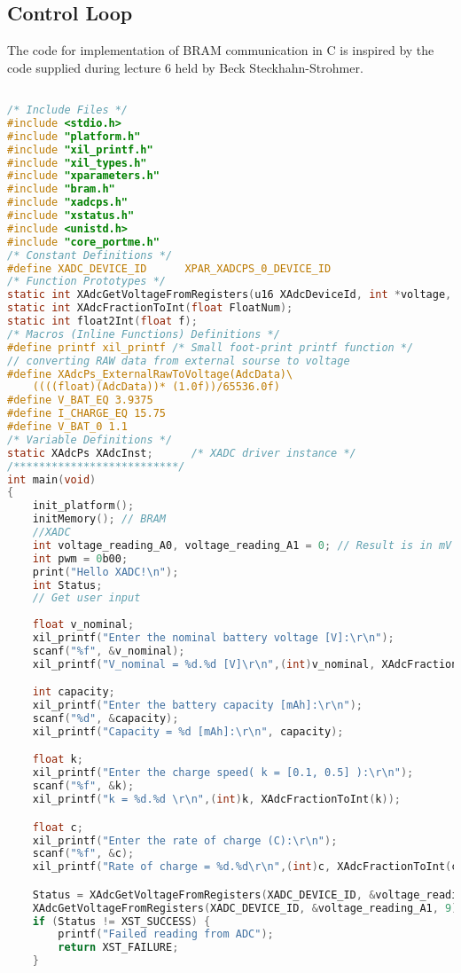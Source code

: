 \documentclass[../report.tex]{subfiles}
\begin{document}
\subsection{Control Loop}
The code for implementation of BRAM communication in C is inspired by the code supplied during lecture 6 held by Beck Steckhahn-Strohmer.
\begin{lstlisting}[language=C, showstringspaces=false]

/* Include Files */
#include <stdio.h>
#include "platform.h"
#include "xil_printf.h"
#include "xil_types.h"
#include "xparameters.h"
#include "bram.h"
#include "xadcps.h"
#include "xstatus.h"
#include <unistd.h>
#include "core_portme.h"
/* Constant Definitions */
#define XADC_DEVICE_ID 		XPAR_XADCPS_0_DEVICE_ID
/* Function Prototypes */
static int XAdcGetVoltageFromRegisters(u16 XAdcDeviceId, int *voltage, int register_offset);
static int XAdcFractionToInt(float FloatNum);
static int float2Int(float f);
/* Macros (Inline Functions) Definitions */
#define printf xil_printf /* Small foot-print printf function */
// converting RAW data from external sourse to voltage
#define XAdcPs_ExternalRawToVoltage(AdcData)\
	((((float)(AdcData))* (1.0f))/65536.0f)
#define V_BAT_EQ 3.9375
#define I_CHARGE_EQ 15.75
#define V_BAT_0 1.1
/* Variable Definitions */
static XAdcPs XAdcInst;      /* XADC driver instance */
/**************************/
int main(void)
{
	init_platform();
	initMemory(); // BRAM
	//XADC
	int voltage_reading_A0, voltage_reading_A1 = 0; // Result is in mV going from 0V = 0 to 1000 = 3.3V
	int pwm = 0b00;
	print("Hello XADC!\n");
	int Status;
	// Get user input
	
	float v_nominal;
	xil_printf("Enter the nominal battery voltage [V]:\r\n");
	scanf("%f", &v_nominal);
	xil_printf("V_nominal = %d.%d [V]\r\n",(int)v_nominal, XAdcFractionToInt(v_nominal));

	int capacity;
	xil_printf("Enter the battery capacity [mAh]:\r\n");
	scanf("%d", &capacity);
	xil_printf("Capacity = %d [mAh]:\r\n", capacity);

	float k;
	xil_printf("Enter the charge speed( k = [0.1, 0.5] ):\r\n");
	scanf("%f", &k);
	xil_printf("k = %d.%d \r\n",(int)k, XAdcFractionToInt(k));

	float c;
	xil_printf("Enter the rate of charge (C):\r\n");
	scanf("%f", &c);
	xil_printf("Rate of charge = %d.%d\r\n",(int)c, XAdcFractionToInt(c));

	Status = XAdcGetVoltageFromRegisters(XADC_DEVICE_ID, &voltage_reading_A0, 1); // read from A0
	XAdcGetVoltageFromRegisters(XADC_DEVICE_ID, &voltage_reading_A1, 9); // read from A1
	if (Status != XST_SUCCESS) {
		printf("Failed reading from ADC");
		return XST_FAILURE;
	}


\end{lstlisting}
\end{document}
